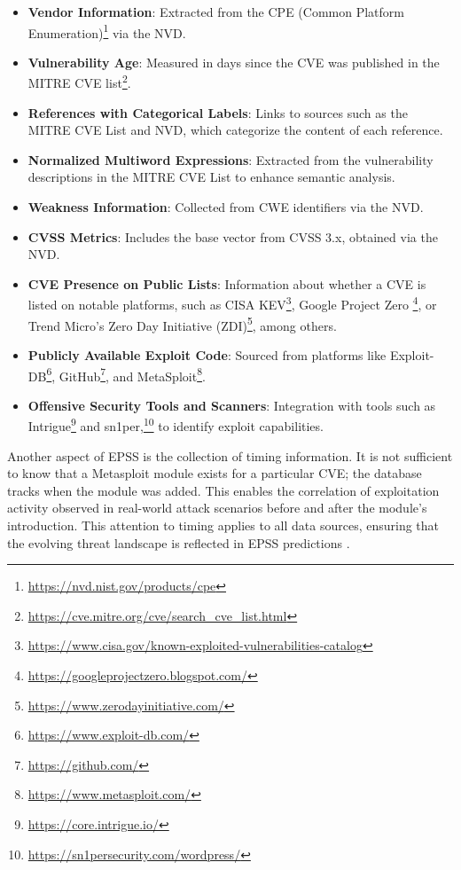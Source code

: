 \begin{itemize}
    \item \textbf{Vendor Information}: Extracted from the CPE (Common Platform Enumeration)\footnote{\url{https://nvd.nist.gov/products/cpe}} via the \ac{NVD}.
    \item \textbf{Vulnerability Age}: Measured in days since the \ac{CVE} was published in the MITRE \ac{CVE} list\footnote{\url{https://cve.mitre.org/cve/search_cve_list.html}}.
    \item \textbf{References with Categorical Labels}: Links to sources such as the MITRE \ac{CVE} List and \ac{NVD}, which categorize the content of each reference.
    \item \textbf{Normalized Multiword Expressions}: Extracted from the vulnerability descriptions in the MITRE \ac{CVE} List to enhance semantic analysis.
    \item \textbf{Weakness Information}: Collected from \ac{CWE} identifiers via the \ac{NVD}.
    \item \textbf{\ac{CVSS} Metrics}: Includes the base vector from CVSS 3.x, obtained via the \ac{NVD}.
    \item \textbf{\ac{CVE} Presence on Public Lists}: Information about whether a \ac{CVE} is listed on notable platforms, such as CISA KEV\footnote{\url{https://www.cisa.gov/known-exploited-vulnerabilities-catalog}}, Google Project Zero \footnote{\url{https://googleprojectzero.blogspot.com/}}, or Trend Micro's Zero Day Initiative (ZDI)\footnote{\url{https://www.zerodayinitiative.com/}}, among others.
    \item \textbf{Publicly Available Exploit Code}: Sourced from platforms like Exploit-DB\footnote{\url{https://www.exploit-db.com/}}, GitHub\footnote{\url{https://github.com/}}, and MetaSploit\footnote{\url{https://www.metasploit.com/}}.
    \item \textbf{Offensive Security Tools and Scanners}: Integration with tools such as Intrigue\footnote{\url{https://core.intrigue.io/}} and sn1per,\footnote{\url{https://sn1persecurity.com/wordpress/}} to identify exploit capabilities.
\end{itemize}

Another aspect of \ac{EPSS} is the collection of timing information. It is not sufficient to know that a Metasploit module exists for a particular \ac{CVE}; the database tracks when the module was added. This enables the correlation of exploitation activity observed in real-world attack scenarios before and after the module's introduction. This attention to timing applies to all data sources, ensuring that the evolving threat landscape is  reflected in \ac{EPSS} predictions \autocite{first_epss_2024}.

